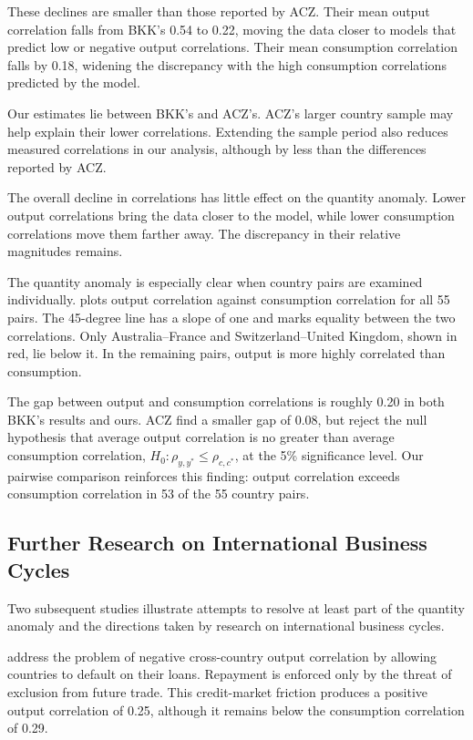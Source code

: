 These declines are smaller than those reported by ACZ. Their mean output correlation falls from BKK's 0.54 to 0.22, moving the data closer to models that predict low or negative output correlations. Their mean consumption correlation falls by 0.18, widening the discrepancy with the high consumption correlations predicted by the model.

Our estimates lie between BKK's and ACZ's. ACZ's larger country sample may help explain their lower correlations. Extending the sample period also reduces measured correlations in our analysis, although by less than the differences reported by ACZ.

The overall decline in correlations has little effect on the quantity anomaly. Lower output correlations bring the data closer to the model, while lower consumption correlations move them farther away. The discrepancy in their relative magnitudes remains.

The quantity anomaly is especially clear when country pairs are examined individually.  plots output correlation against consumption correlation for all 55 pairs. The 45-degree line has a slope of one and marks equality between the two correlations. Only Australia--France and Switzerland--United Kingdom, shown in red, lie below it. In the remaining pairs, output is more highly correlated than consumption.


The gap between output and consumption correlations is roughly 0.20 in both BKK's results and ours. ACZ find a smaller gap of 0.08, but reject the null hypothesis that average output correlation is no greater than average consumption correlation, $H_0: \rho_{y,y^*} \leq \rho_{c,c^*}$, at the 5\% significance level. Our pairwise comparison reinforces this finding: output correlation exceeds consumption correlation in 53 of the 55 country pairs.


\subsection{Further Research on International Business Cycles}

Two subsequent studies illustrate attempts to resolve at least part of the quantity anomaly and the directions taken by research on international business cycles.

\cite{Kehoe:2002aa} address the problem of negative cross-country output correlation by allowing countries to default on their loans. Repayment is enforced only by the threat of exclusion from future trade. This credit-market friction produces a positive output correlation of 0.25, although it remains below the consumption correlation of 0.29.


